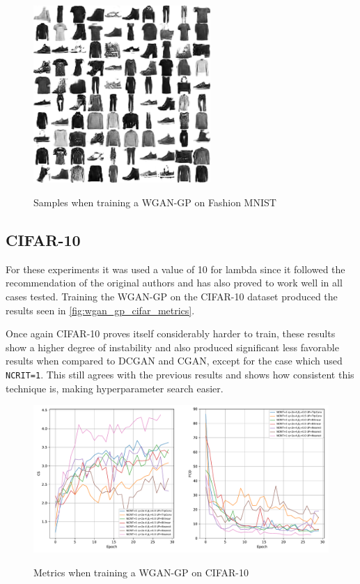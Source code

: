 \begin{figure}
    \centering
    \caption{Samples when training a WGAN-GP on Fashion MNIST}
    \includegraphics[width=0.6\textwidth]{chapters/Experiments/WGAN-GP/fashion_samples.png}
    \label{fig:wgan_gp_fashion_samples}
\end{figure}


\subsection{CIFAR-10}
For these experiments it was used a value of 10 for \gls{lambda} since it followed the recommendation of the original authors and has also proved to work well in all cases tested. Training the \gls{WGAN-GP} on the \gls{CIFAR}-10 dataset produced the results seen in \autoref{fig:wgan_gp_cifar_metrics}.

Once again \gls{CIFAR}-10 proves itself considerably harder to train, these results show a higher degree of instability and also produced significant less favorable results when compared to \gls{DCGAN} and \gls{CGAN}, except for the case which used \texttt{NCRIT=1}. This still agrees with the previous results and shows how consistent this technique is, making hyperparameter search easier.

\begin{figure}[hbt]
    \centering
    \caption{Metrics when training a WGAN-GP on CIFAR-10}
    \includegraphics[width=\textwidth]{chapters/Experiments/WGAN-GP/cifar_metrics.pdf}
    \label{fig:wgan_gp_cifar_metrics}
\end{figure}

